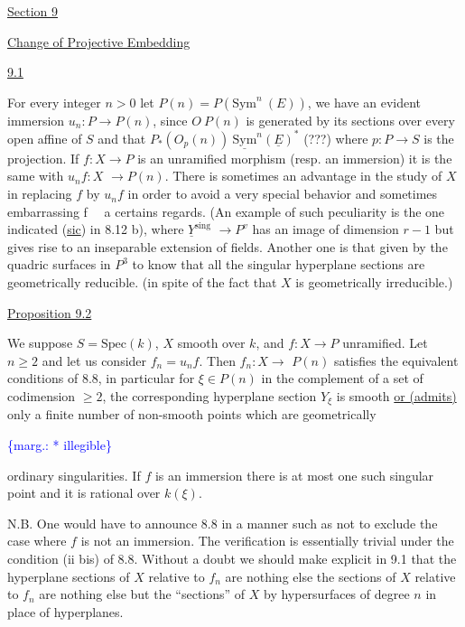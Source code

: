 \documentclass[11pt]{article}
\newcommand{\scanpage}[1]{\par\bigskip\noindent{\small\sffamily[scan #1]}\par}
\newcommand{\mspage}[1]{{\small\sffamily[p.\,#1]}}
\newcommand{\margin}[1]{\textcolor{blue}{\{\textsf{marg.:} #1\}}}
\newcommand{\uline}[1]{\underline{#1}}
\begin{document}
\uline{Section 9}

\uline{Change of Projective Embedding}

\uline{9.1}

For every integer $n > 0$ let $P(n) = P(\mathrm{Sym}^{n}\ (E))$, we have an
evident immersion $u_{n}\colon P \to P(n)$, since $O\ P(n)$ is generated by its
sections over every open affine of $S$ and that $P_{*}(O_{p}(n))\ \underline{\mathrm{Sym}}^{n}(\underline{E})^{*}$
(???) where $p\colon P \to S$ is the projection.  If $f\colon X \to P$ is an
unramified morphism (resp. an immersion) it is the same with $u_{n}f\colon X$
$\to P(n)$.  There is sometimes an advantage in the study of $X$ in
replacing $f$ by $u_{n}f$ in order to avoid a very special behavior and
sometimes embarrassing f \ \ a certains regards.  (An example of
such peculiarity is the one indicated (\uline{sic}) in 8.12 b), where $\underline{Y}^{\mathrm{sing}}$
$\to P^{v}$ has an image of dimension $r - 1$ but gives rise to an
inseparable extension of fields.  Another one is that given by the
quadric surfaces in $P^{3}$ to know that all the singular hyperplane
sections are geometrically reducible.  (in spite of the fact that
$X$ is geometrically irreducible.)

\uline{Proposition 9.2}

We suppose $S = \mathrm{Spec}(k)$, $X$ smooth over $k$, and $f\colon X \to P$
unramified.  Let $n \geq 2$ and let us consider $f_{n} = u_{n}f$.  Then $f_{n}\colon X \to$
$P(n)$ satisfies the equivalent conditions of 8.8, in particular for
$\xi \in P(n)$ in the complement of a set of codimension $\geq 2$, the
corresponding hyperplane section $Y_{\xi}$ is smooth \uline{or (admits)} only a
finite number of non-smooth points which are geometrically

\margin{* illegible}

\clearpage
\scanpage{24/64}
\mspage{64}

ordinary singularities.  If $f$ is an immersion there is at most one
such singular point and it is rational over $k(\xi)$.

N.B. One would have to announce 8.8 in a manner such as not
to exclude the case where $f$ is not an immersion.  The verification
is essentially trivial under the condition (ii bis) of 8.8.
Without a doubt we should make explicit in 9.1 that the hyperplane
sections of $X$ relative to $f_n$ are nothing else the sections of $X$
relative to $f_n$ are nothing else but the ``sections'' of $X$ by
hypersurfaces of degree $n$ in place of hyperplanes.
\end{document}
